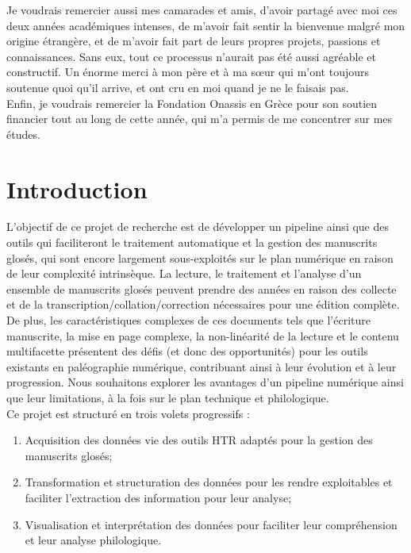 \documentclass[a4paper, twoside, 12pt]{book}
\begin{document}
Je voudrais remercier aussi mes camarades et amis, d’avoir partagé avec moi ces deux années académiques intenses, de m'avoir fait sentir la bienvenue malgré mon origine étrangère, et de m'avoir fait part de leurs propres projets, passions et connaissances. Sans eux, tout ce processus n'aurait pas été aussi agréable et constructif. Un énorme merci à mon père et à ma sœur qui m'ont toujours soutenue quoi qu'il arrive, et ont cru en moi quand je ne le faisais pas.\\

Enfin, je voudrais remercier la Fondation Onassis en Grèce pour son soutien financier tout au long de cette année, qui m'a permis de me concentrer sur mes études.

\tableofcontents

\clearpage

\mainmatter







\chapter{Introduction}

L'objectif de ce projet de recherche est de développer un pipeline ainsi que des outils qui faciliteront le traitement automatique et la gestion des manuscrits glosés, qui sont encore largement sous-exploités sur le plan numérique en raison de leur complexité intrinsèque. La lecture, le traitement et l'analyse d'un ensemble de manuscrits glosés peuvent prendre des années en raison des collecte et de la transcription/collation/correction nécessaires pour une édition complète. De plus, les caractéristiques complexes de ces documents tels que l'écriture manuscrite, la mise en page complexe, la non-linéarité de la lecture et le contenu multifacette présentent des défis (et donc des opportunités) pour les outils existants en paléographie numérique, contribuant ainsi à leur évolution et à leur progression. Nous souhaitons explorer les avantages d'un pipeline numérique ainsi que leur limitations, à la fois sur le plan technique et philologique.\\ 
Ce projet est structuré en trois volets progressifs : \\
\begin{enumerate}
\item Acquisition des données vie des outils HTR adaptés pour la gestion des manuscrits glosés;
\item Transformation et structuration des données pour les rendre exploitables et faciliter l'extraction des information pour leur analyse;
\item Visualisation et interprétation des données pour faciliter leur compréhension et leur analyse philologique.
\end{enumerate}
\end{document}
